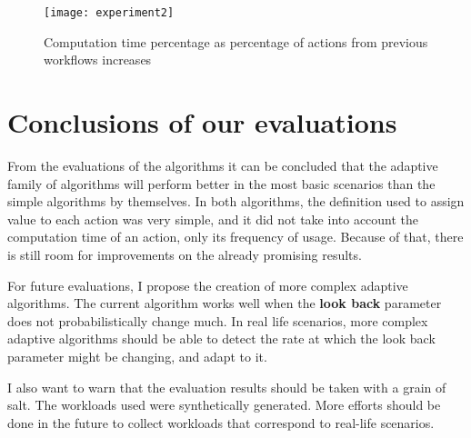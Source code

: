 \begin{figure}
\centering
\texttt{[image: experiment2]}
\caption{Computation time percentage as percentage of actions from previous workflows increases}
\label{fig:experiment2}
\end{figure}

\section{Conclusions of our evaluations}
From the evaluations of the algorithms it can be concluded that the adaptive family of algorithms will perform better in the most basic scenarios than the simple algorithms by themselves.  In both algorithms, the definition used to assign value to each action was very simple, and it did not take into account the computation time of an action, only its frequency of usage.  Because of that, there is still room for improvements on the already promising results. 

For future evaluations, I propose the creation of more complex adaptive algorithms.  The current algorithm works well when the \textbf{look back} parameter does not probabilistically change much.  In real life scenarios, more complex adaptive algorithms should be able to detect the rate at which the look back parameter might be changing, and adapt to it.

I also want to warn that the evaluation results should be taken with a grain of salt. The workloads used were synthetically generated.  More efforts should be done in the future to collect workloads that correspond to real-life scenarios.